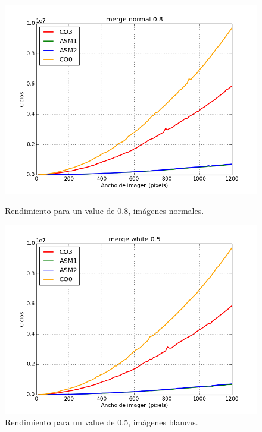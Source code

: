 \documentclass[a4paper]{article}
\begin{document}
\begin{figure}[H]
	\begin{center}
		\includegraphics[scale=0.4]{../tp2-bundle.v2/Testing/plots/all/merge-normal-08--all.png}
		\caption{Rendimiento para un value de 0.8, imágenes normales.}
		\label{fig:exp1-0.5}
	\end{center}
	\endminipage\hfill
	\begin{center}
		\includegraphics[scale=0.4]{../tp2-bundle.v2/Testing/plots/all/merge-white-05--all.png}
		\caption{Rendimiento para un value de 0.5, imágenes blancas.}
		\label{fig:exp1-0.5}
	\end{center}
	\endminipage\hfill
\end{figure}
\end{document}
